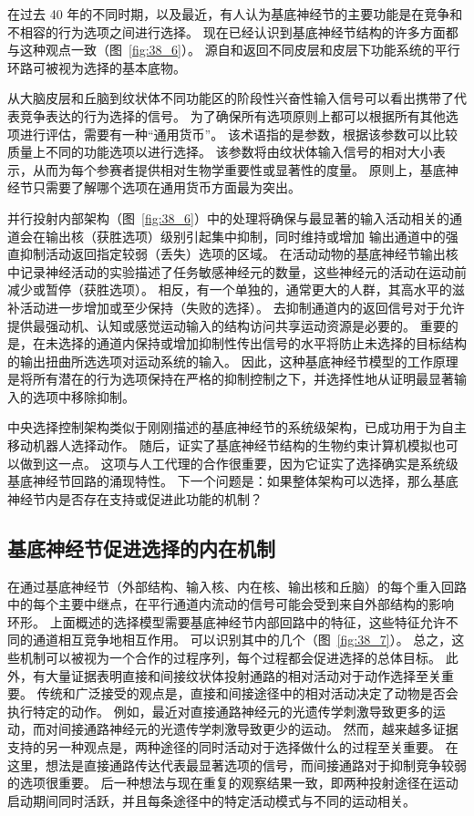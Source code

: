 在过去 40 年的不同时期，以及最近，有人认为基底神经节的主要功能是在竞争和不相容的行为选项之间进行选择。
现在已经认识到基底神经节结构的许多方面都与这种观点一致（图~\ref{fig:38_6}）。
源自和返回不同皮层和皮层下功能系统的平行环路可被视为选择的基本底物。


从大脑皮层和丘脑到纹状体不同功能区的阶段性兴奋性输入信号可以看出携带了代表竞争表达的行为选择的信号。
为了确保所有选项原则上都可以根据所有其他选项进行评估，需要有一种“通用货币”。
该术语指的是参数，根据该参数可以比较质量上不同的功能选项以进行选择。
该参数将由纹状体输入信号的相对大小表示，从而为每个参赛者提供相对生物学重要性或显著性的度量。
原则上，基底神经节只需要了解哪个选项在通用货币方面最为突出。


并行投射内部架构（图~\ref{fig:38_6}）中的处理将确保与最显著的输入活动相关的通道会在输出核（获胜选项）级别引起集中抑制，同时维持或增加 输出通道中的强直抑制活动返回指定较弱（丢失）选项的区域。
在活动动物的基底神经节输出核中记录神经活动的实验描述了任务敏感神经元的数量，这些神经元的活动在运动前减少或暂停（获胜选项）。
相反，有一个单独的，通常更大的人群，其高水平的滋补活动进一步增加或至少保持（失败的选择）。
去抑制通道内的返回信号对于允许提供最强动机、认知或感觉运动输入的结构访问共享运动资源是必要的。
重要的是，在未选择的通道内保持或增加抑制性传出信号的水平将防止未选择的目标结构的输出扭曲所选选项对运动系统的输入。
因此，这种基底神经节模型的工作原理是将所有潜在的行为选项保持在严格的抑制控制之下，并选择性地从证明最显著输入的选项中移除抑制。


中央选择控制架构类似于刚刚描述的基底神经节的系统级架构，已成功用于为自主移动机器人选择动作。
随后，证实了基底神经节结构的生物约束计算机模拟也可以做到这一点。
这项与人工代理的合作很重要，因为它证实了选择确实是系统级基底神经节回路的涌现特性。
下一个问题是：如果整体架构可以选择，那么基底神经节内是否存在支持或促进此功能的机制？


\subsection{基底神经节促进选择的内在机制}

在通过基底神经节（外部结构、输入核、内在核、输出核和丘脑）的每个重入回路中的每个主要中继点，在平行通道内流动的信号可能会受到来自外部结构的影响 环形。
上面概述的选择模型需要基底神经节内部回路中的特征，这些特征允许不同的通道相互竞争地相互作用。
可以识别其中的几个（图~\ref{fig:38_7}）。
总之，这些机制可以被视为一个合作的过程序列，每个过程都会促进选择的总体目标。
此外，有大量证据表明直接和间接纹状体投射通路的相对活动对于动作选择至关重要。
传统和广泛接受的观点是，直接和间接途径中的相对活动决定了动物是否会执行特定的动作。
例如，最近对直接通路神经元的光遗传学刺激导致更多的运动，而对间接通路神经元的光遗传学刺激导致更少的运动。
然而，越来越多证据支持的另一种观点是，两种途径的同时活动对于选择做什么的过程至关重要。
在这里，想法是直接通路传达代表最显著选项的信号，而间接通路对于抑制竞争较弱的选项很重要。
后一种想法与现在重复的观察结果一致，即两种投射途径在运动启动期间同时活跃，并且每条途径中的特定活动模式与不同的运动相关。



